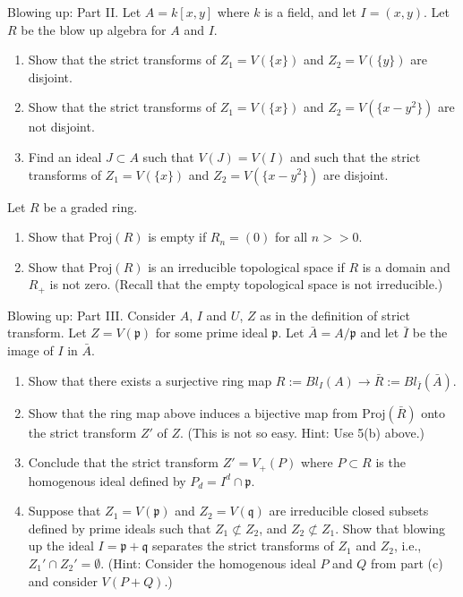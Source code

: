 \begin{exercise}
Blowing up: Part II.
Let $A = k[x,y]$ where $k$ is a field, and let $I=(x,y)$.
Let $R$ be the blow up algebra for $A$ and $I$.
\begin{enumerate}
\item Show that the strict transforms of $Z_1=V(\{x\})$ and
$Z_2=V(\{y\})$ are disjoint.
\item Show that the strict transforms of $Z_1=V(\{x\})$ and
$Z_2=V(\{x-y^2\})$ are not disjoint.
\item Find an ideal $J \subset A$ such that $V(J) = V(I)$
and such that the strict transforms of $Z_1=V(\{x\})$ and
$Z_2=V(\{x-y^2\})$ are disjoint.
\end{enumerate}
\end{exercise}

\begin{exercise}
Let $R$ be a graded ring.
\begin{enumerate}
\item Show that $\text{Proj}(R)$ is empty if $R_n=(0)$ for all $n >> 0$.
\item Show that $\text{Proj}(R)$ is an irreducible topological space
if $R$ is a domain and $R_{+}$ is not zero. (Recall that the empty
topological space is not irreducible.)
\end{enumerate}
\end{exercise}

\begin{exercise}
Blowing up: Part III.
Consider $A$, $I$ and $U$, $Z$ as in the definition of strict transform.
Let $Z = V({\mathfrak p})$ for some prime ideal ${\mathfrak p}$. Let $\bar A = A/{\mathfrak p}$ and let
$\bar I$ be the image of $I$ in $\bar A$.
\begin{enumerate}
\item Show that there exists a surjective ring map
$R:=Bl_I(A) \to \bar R:=Bl_{\bar I}(\bar A)$.
\item Show that the ring map above induces a bijective map
from $\text{Proj}(\bar R)$ onto the strict transform $Z'$ of $Z$. (This
is not so easy. Hint: Use 5(b) above.)
\item Conclude that the strict transform $Z' = V_{+}(P)$ where
$P \subset R$ is the homogenous ideal defined by $P_d = I^d \cap {\mathfrak p}$.
\item Suppose that $Z_1=V({\mathfrak p})$ and
$Z_2=V({\mathfrak q})$ are irreducible
closed subsets defined by prime ideals such that  $Z_1 \not \subset Z_2$,
and $Z_2 \not \subset Z_1$. Show that blowing up the ideal
$I = {\mathfrak p} + {\mathfrak q}$ separates the
strict transforms of $Z_1$ and $Z_2$,
i.e., $Z_1' \cap Z_2' = \emptyset$. (Hint: Consider the homogenous
ideal $P$ and $Q$ from part (c) and consider $V(P + Q)$.)
\end{enumerate}
\end{exercise}


